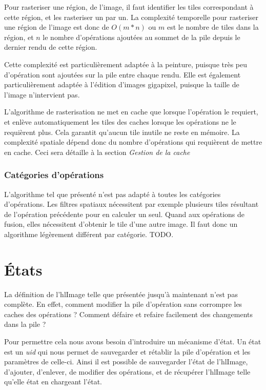 		Pour rasteriser une région, de l'image, il faut identifier les tiles correspondant à cette région, et les rasteriser un par un. La complexité
		temporelle pour rasteriser une région de l'image est donc de $O(m*n)$ ou $m$ est le nombre de tiles dans la région, et $n$ le nombre d'opérations
		ajoutées au sommet de la pile depuis le dernier rendu de cette région. 

		Cette complexité est particulièrement adaptée à la peinture, puisque très peu d'opération sont ajoutées sur la pile entre chaque rendu.
		Elle est également particulièrement adaptée à l'édition d'images gigapixel, puisque la taille de l'image n'intervient pas. 
		
		L'algorithme de rasterisation ne met en cache que lorsque l'opération le requiert, et enlève automatiquement les tiles des caches lorsque
		les opérations ne le requièrent plus. Cela garantit qu'aucun tile inutile ne reste en mémoire. La complexité spatiale dépend donc du
		nombre d'opérations qui requièrent de mettre en cache. Ceci sera détaille à la section \emph{Gestion de la cache}
		
		\subsubsection{Catégories d'opérations}
		L'algorithme tel que présenté n'est pas adapté à toutes les catégories d'opérations. Les filtres spatiaux nécessitent par exemple plusieurs tiles
		résultant de l'opération précédente pour en calculer un seul. Quand aux opérations de fusion, elles nécessitent d'obtenir le tile d'une
		autre image. Il faut donc un algorithme légèrement différent par catégorie. TODO.
		
	\section{États}
		La définition de l'hlImage telle que présentée jusqu'à maintenant n'est pas complète. En effet, comment modifier la pile d'opération sans
		corrompre les caches des opérations ? Comment défaire et refaire facilement des changements dans la pile ? 
		
		Pour permettre cela nous avons besoin d'introduire un mécanisme d'état. Un état est un \emph{uid} qui nous permet de sauvegarder et rétablir la
		pile d'opération et les paramètres de celle-ci. Ainsi il est possible de sauvegarder l'état de l'hlImage, d'ajouter, d'enlever, 
		de modifier des opérations, et de récupérer l'hlImage telle qu'elle état en chargeant l'état.

